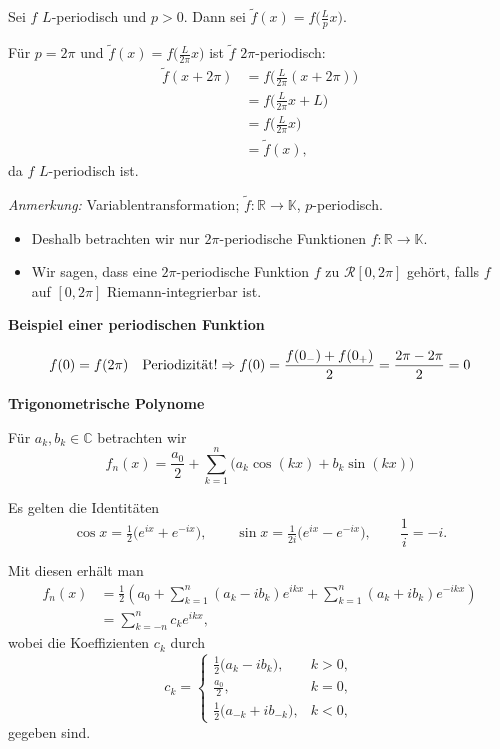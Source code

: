\begin{beispielbox}
    Sei $f$ $L$-periodisch und $p>0$. Dann sei $\tilde f(x)=f\!\bigl(\tfrac{L}{p}x\bigr)$.

    Für $p=2\pi$ und $\tilde f(x)=f\!\bigl(\tfrac{L}{2\pi}x\bigr)$ ist $\tilde f$ $2\pi$-periodisch:
    $$
    \begin{aligned}
    \tilde f(x+2\pi)
    &= f\!\bigl(\tfrac{L}{2\pi}(x+2\pi)\bigr) \\
    &= f\!\bigl(\tfrac{L}{2\pi}x + L\bigr) \\
    &= f\!\bigl(\tfrac{L}{2\pi}x\bigr) \\
    &= \tilde f(x),
    \end{aligned}
    $$
    da $f$ $L$-periodisch ist.

    \smallskip

    \noindent\emph{Anmerkung:} Variablentransformation; $\tilde f:\mathbb{R}\to\mathbb{K}$, $p$-periodisch.

    \bigskip

    \begin{itemize}
        \item Deshalb betrachten wir nur $2\pi$-periodische Funktionen $f:\mathbb{R}\to\mathbb{K}$.
        \item Wir sagen, dass eine $2\pi$-periodische Funktion $f$ zu $\mathcal{R}[0,2\pi]$ gehört, falls $f$ auf $[0,2\pi]$ Riemann-integrierbar ist.
    \end{itemize}

    
    \textbf{Beispiel einer periodischen Funktion}

    $$
        f(0)=f(2\pi) \quad  \text{Periodizität!} \\
        \\
        \Rightarrow f(0)=\frac{f(0_-)+f(0_+)}{2}=\frac{2\pi-2\pi}{2}=0
    $$

    \textbf{Trigonometrische Polynome}

    Für $a_k,b_k\in\mathbb{C}$ betrachten wir
    $$
    \boxed{\,f_n(x)=\frac{a_0}{2}+\sum_{k=1}^n\bigl(a_k\cos(kx)+b_k\sin(kx)\bigr)\,}
    $$

    Es gelten die Identitäten
    $$
    \cos x=\tfrac{1}{2}\bigl(e^{ix}+e^{-ix}\bigr),\qquad
    \sin x=\tfrac{1}{2i}\bigl(e^{ix}-e^{-ix}\bigr),\qquad
    \frac{1}{i}=-i.
    $$

    Mit diesen erhält man
    $$
    \begin{aligned}
    f_n(x)
    &=\frac{1}{2}\left(a_0+\sum_{k=1}^n (a_k-i b_k)e^{ikx}+\sum_{k=1}^n (a_k+i b_k)e^{-ikx}\right)\\
    &=\sum_{k=-n}^{n} c_k e^{ikx},
    \end{aligned}
    $$
    wobei die Koeffizienten $c_k$ durch
    $$
    c_k=
    \begin{cases}
    \displaystyle \tfrac{1}{2}\bigl(a_k-i b_k\bigr), & k>0,\\[6pt]
    \displaystyle \tfrac{a_0}{2}, & k=0,\\[6pt]
    \displaystyle \tfrac{1}{2}\bigl(a_{-k}+i b_{-k}\bigr), & k<0,
    \end{cases}
    $$
    gegeben sind.


\end{beispielbox}

